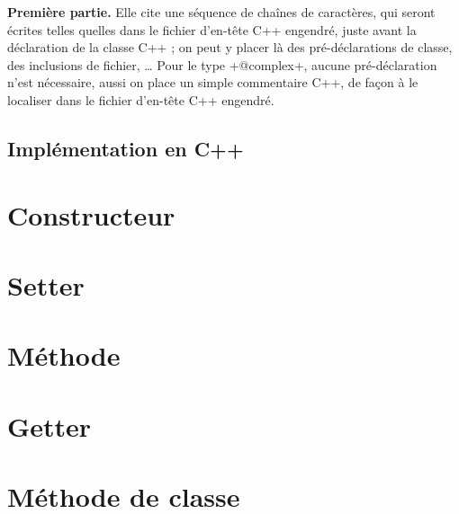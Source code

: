 \textbf{Première partie.} Elle cite une séquence de chaînes de caractères, qui seront écrites telles quelles dans le fichier d'en-tête C++ engendré, juste avant la déclaration de la classe C++ ; on peut y placer là des pré-déclarations de classe, des inclusions de fichier, … Pour le type \ggs+@complex+, aucune pré-déclaration n'est nécessaire, aussi on place un simple commentaire C++, de façon à le localiser dans le fichier d'en-tête C++ engendré.

\subsection{Implémentation en C++}






\section{Constructeur}


\section{Setter}


\section{Méthode}


\section{Getter}


\section{Méthode de classe}


